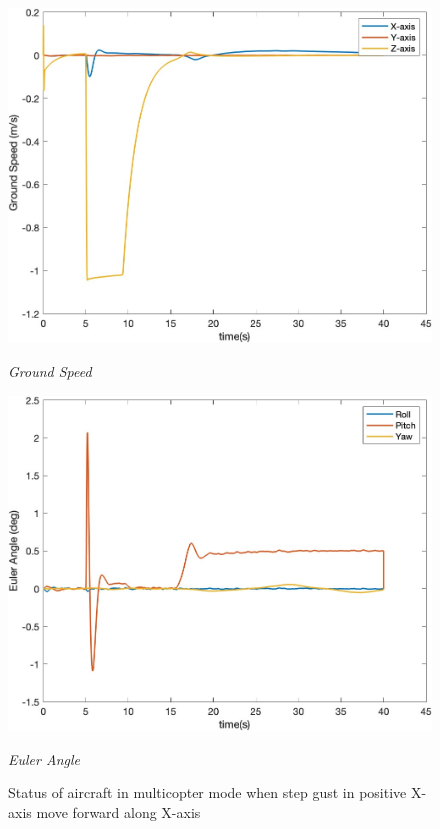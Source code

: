 \begin{figure}[htbp]
  \begin{minipage}[b]{0.45\textwidth}
    \centering
    \includegraphics[width=\textwidth]{Images/Gust/VTOL step/3 groundspeed_2.jpg}
    \caption*{\textit{Ground Speed}}
  \end{minipage}
  \hfil
  \begin{minipage}[b]{0.45\textwidth}
    \centering
    \includegraphics[width=\textwidth]{Images/Gust/VTOL step/4 EulerAngle_2.jpg}
    \caption*{\textit{Euler Angle}}
  \end{minipage}
  \caption{Status of aircraft in multicopter mode when step gust in positive X-axis move forward along X-axis}
  \label{fig:VTOL step x}
\end{figure}

